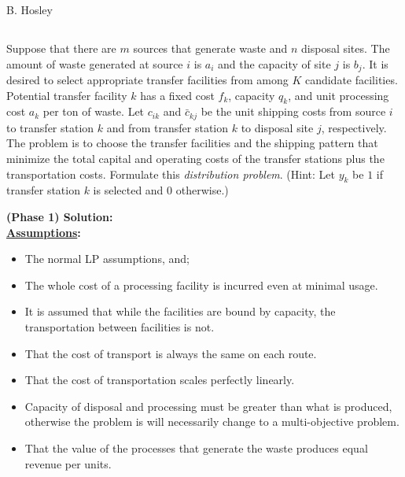 \documentclass[12pt]{amsart}
\begin{document}
\raggedbottom

\hspace{\fill} {\large B. Hosley}
\bigskip


\setcounter{section}{1}
\setcounter{subsection}{24}
\subsection{} 

Suppose that there are \(m\) sources that generate waste and \(n\) disposal sites. 
The amount of waste generated at source \(i\) is \(a_i\) and the capacity of site \(j\) is \(b_j\). 
It is desired to select appropriate transfer facilities from among \(K\) candidate 
facilities. Potential transfer facility \(k\) has a fixed cost \(f_k\), capacity \(q_k\), and unit 
processing cost \(a_k\) per ton of waste. Let \(c_{ik}\) and \(\bar c_{kj}\) be the unit shipping costs 
from source \(i\) to transfer station \(k\) and from transfer station \(k\) to disposal site  \(j\), 
respectively. The problem is to choose the transfer facilities and the shipping 
pattern that minimize the total capital and operating costs of the transfer stations 
plus the transportation costs. Formulate this \textit{distribution problem}. (Hint: Let \(y_k\) 
be \(1\) if transfer station \(k\) is selected and \(0\) otherwise.) \\ \bigskip


\textbf{(Phase 1) Solution:} \\

\textbf{\underline{Assumptions}:}

\begin{itemize}
	\item The normal LP assumptions, and;
	\item The whole cost of a processing facility is incurred even at minimal usage.
	\item It is assumed that while the facilities are bound by capacity, the transportation
	between facilities is not.
	\item That the cost of transport is always the same on each route.
	\item That the cost of transportation scales perfectly linearly.
	\item Capacity of disposal and processing must be greater than what is produced, 
	otherwise the problem is will necessarily change to a multi-objective problem.
	\item That the value of the processes that generate the waste produces equal revenue
	per units.
\end{itemize} \bigskip
\end{document}
